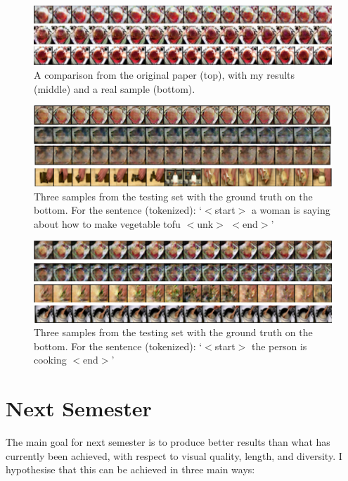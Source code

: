 \documentclass{article}
\begin{document}
{{\begin{figure}[H]
    \centering
    \includegraphics[width=0.8\linewidth]{imgs/mrvdc/compare.png}
    \caption{A comparison from the original paper (top), with my results (middle) and a real sample (bottom). }
\end{figure}

\begin{figure}[H]
    \centering
    \includegraphics[width=0.8\linewidth]{imgs/mrvdc/test1.png}
    \caption{Three samples from the testing set with the ground truth on the bottom. For the sentence (tokenized): `$<$start$>$ a woman is saying about how to make vegetable tofu $<$unk$>$ $<$end$>$'}
\end{figure}

\begin{figure}[H]
    \centering
    \includegraphics[width=0.8\linewidth]{imgs/mrvdc/test2.png}
    \caption{Three samples from the testing set with the ground truth on the bottom. For the sentence (tokenized): `$<$start$>$ the person is cooking $<$end$>$'}
\end{figure}

\section{Next Semester}

The main goal for next semester is to produce better results than what has currently 
been achieved, with respect to visual quality, length, and diversity. I hypothesise that this
can be achieved in three main ways: 

}}
\end{document}
